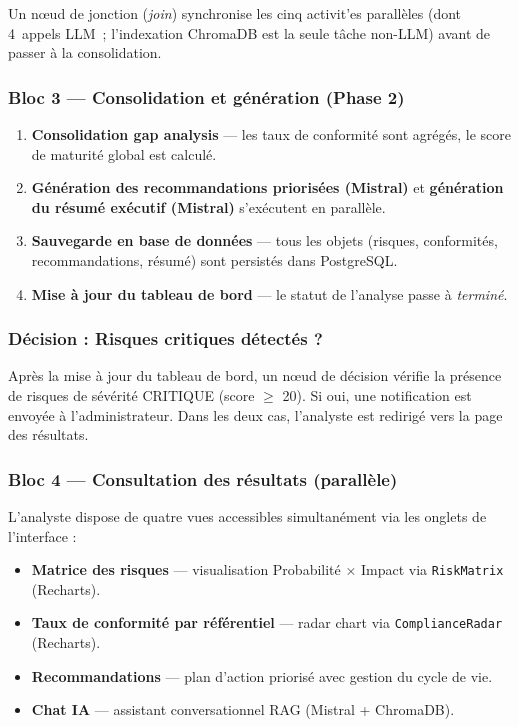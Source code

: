 \documentclass[a4paper,12pt,oneside]{report}
\begin{document}
	Un nœud de jonction (\textit{join}) synchronise les cinq activit'es
	parallèles (dont 4~appels LLM~; l'indexation ChromaDB est la seule t\^ache non-LLM)
	avant de passer à la consolidation.
	
	\subsubsection*{Bloc 3 — Consolidation et génération (Phase 2)}
	
	\begin{enumerate}
		\item \textbf{Consolidation gap analysis} — les taux de conformité
		sont agrégés, le score de maturité global est calculé.
		\item \textbf{Génération des recommandations priorisées (Mistral)} et
		\textbf{génération du résumé exécutif (Mistral)} s'exécutent en
		parallèle.
		\item \textbf{Sauvegarde en base de données} — tous les objets (risques,
		conformités, recommandations, résumé) sont persistés dans PostgreSQL.
		\item \textbf{Mise à jour du tableau de bord} — le statut de l'analyse
		passe à \textit{terminé}.
	\end{enumerate}
	
	\subsubsection*{Décision : Risques critiques détectés ?}
	
	Après la mise à jour du tableau de bord, un nœud de décision vérifie
	la présence de risques de sévérité CRITIQUE (score $\geq$ 20). Si oui,
	une notification est envoyée à l'administrateur. Dans les deux cas,
	l'analyste est redirigé vers la page des résultats.
	
	\subsubsection*{Bloc 4 — Consultation des résultats (parallèle)}
	
	L'analyste dispose de quatre vues accessibles simultanément via les
	onglets de l'interface :
	\begin{itemize}
		\item \textbf{Matrice des risques} — visualisation Probabilité × Impact
		via \texttt{RiskMatrix} (Recharts).
		\item \textbf{Taux de conformité par référentiel} — radar chart
		via \texttt{ComplianceRadar} (Recharts).
		\item \textbf{Recommandations} — plan d'action priorisé avec gestion
		du cycle de vie.
		\item \textbf{Chat IA} — assistant conversationnel RAG (Mistral +
		ChromaDB).
	\end{itemize}
	
\end{document}
